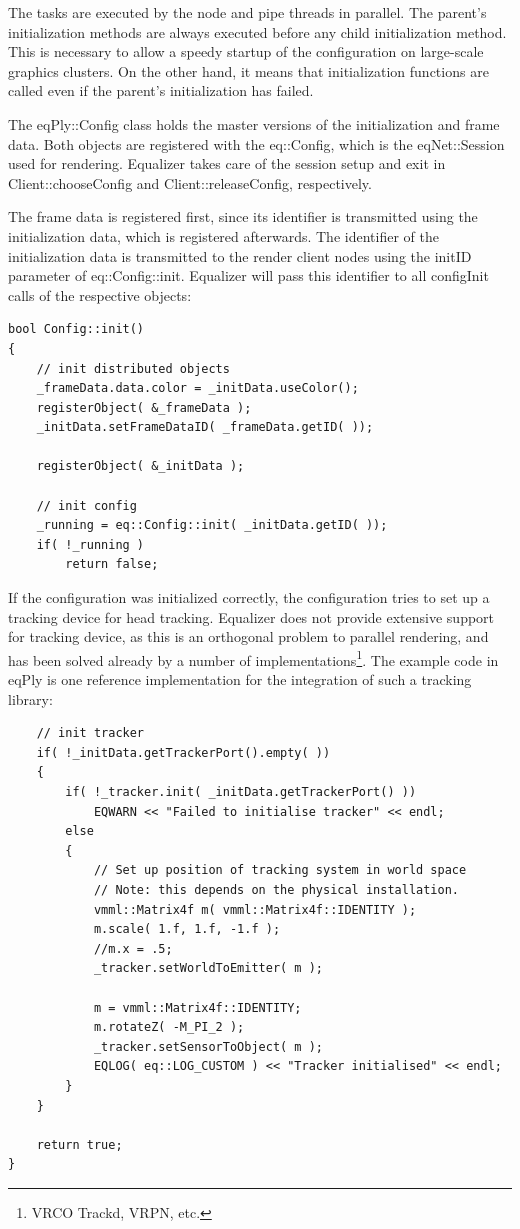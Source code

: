 \documentclass[10pt,a4]{scrartcl}
\begin{document}
The tasks are executed by the node and pipe threads in parallel. The
parent's initialization methods are always executed before any child
initialization method. This is necessary to allow a speedy startup of
the configuration on large-scale graphics clusters. On the other hand,
it means that initialization functions are called even if the parent's
initialization has failed.

The \textsf{eqPly::Config} class holds the master versions of the
initialization and frame data. Both objects are registered with the
\textsf{eq::Config}, which is the \textsf{eqNet::Session} used for
rendering. Equalizer takes care of the session setup and exit in
\textsf{Client::choose\-Config} and \textsf{Client::releaseConfig},
respectively.

The frame data is registered first, since its identifier is transmitted
using the initialization data, which is registered afterwards. The
identifier of the initialization data is transmitted to the render
client nodes using the \textsf{initID} parameter of
\textsf{eq::Config::init}. Equalizer will pass this identifier to all
\textsf{configInit} calls of the respective objects:

{\footnotesize\begin{lstlisting}
bool Config::init()
{
    // init distributed objects
    _frameData.data.color = _initData.useColor();
    registerObject( &_frameData );
    _initData.setFrameDataID( _frameData.getID( ));

    registerObject( &_initData );

    // init config
    _running = eq::Config::init( _initData.getID( ));
    if( !_running )
        return false;
\end{lstlisting}}

If the configuration was initialized correctly, the configuration tries
to set up a tracking device for head tracking. Equalizer does not
provide extensive support for tracking device, as this is an orthogonal
problem to parallel rendering, and has been solved already by a number
of implementations\footnote{VRCO Trackd, VRPN, etc.}. The example
code in \textsf{eqPly} is one reference implementation for the
integration of such a tracking library:

{\footnotesize\begin{lstlisting}
    // init tracker
    if( !_initData.getTrackerPort().empty( ))
    {
        if( !_tracker.init( _initData.getTrackerPort() ))
            EQWARN << "Failed to initialise tracker" << endl;
        else
        {
            // Set up position of tracking system in world space
            // Note: this depends on the physical installation.
            vmml::Matrix4f m( vmml::Matrix4f::IDENTITY );
            m.scale( 1.f, 1.f, -1.f );
            //m.x = .5;
            _tracker.setWorldToEmitter( m );

            m = vmml::Matrix4f::IDENTITY;
            m.rotateZ( -M_PI_2 );
            _tracker.setSensorToObject( m );
            EQLOG( eq::LOG_CUSTOM ) << "Tracker initialised" << endl;
        }
    }

    return true;
}
\end{lstlisting}}%
\end{document}
